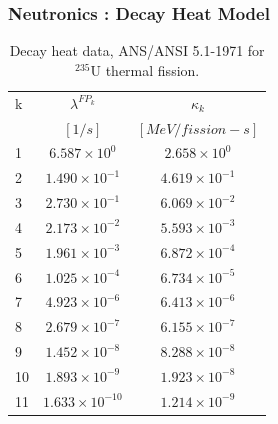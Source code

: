 \begin{frame}[fragile]
  \frametitle{Neutronics : Decay Heat Model}
    \begin{table}
      \begin{tabular}{|l|c|c|}
        \hline
        k & $\lambda^{FP_k}$ & $\kappa_k$\\
                          &  $[1/s]$         & $[MeV/fission-s]$ \\
        \hline
        1   &  $ 6.587\times10^{  0} $  &  $ 2.658\times10^{  0}$ \\
        2   &  $ 1.490\times10^{ -1} $  &  $ 4.619\times10^{ -1}$ \\
        3   &  $ 2.730\times10^{ -1} $  &  $ 6.069\times10^{ -2}$ \\
        4   &  $ 2.173\times10^{ -2} $  &  $ 5.593\times10^{ -3}$ \\
        5   &  $ 1.961\times10^{ -3} $  &  $ 6.872\times10^{ -4}$ \\
        6   &  $ 1.025\times10^{ -4} $  &  $ 6.734\times10^{ -5}$ \\
        7   &  $ 4.923\times10^{ -6} $  &  $ 6.413\times10^{ -6}$ \\
        8   &  $ 2.679\times10^{ -7} $  &  $ 6.155\times10^{ -7}$ \\
        9   &  $ 1.452\times10^{ -8} $  &  $ 8.288\times10^{ -8}$ \\
       10   &  $ 1.893\times10^{ -9} $  &  $ 1.923\times10^{ -8}$ \\
       11   &  $ 1.633\times10^{-10} $  &  $ 1.214\times10^{ -9}$ \\
       \hline
      \end{tabular}
      \caption{Decay heat data, ANS/ANSI 5.1-1971 for $^{235}$U thermal fission.}
      \label{tab:decayheat}
    \end{table}

\end{frame}


